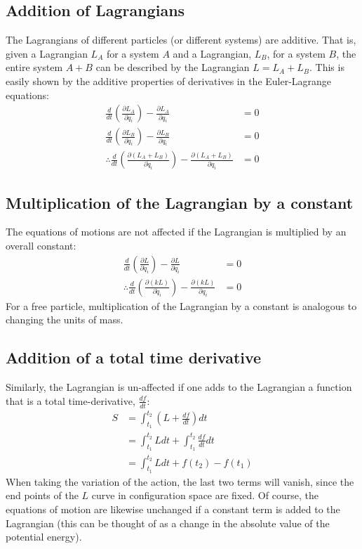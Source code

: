 \subsection{Addition of Lagrangians}
The Lagrangians of different particles (or different systems) are additive. That is, given a Lagrangian $L_A$ for a system $A$ and a Lagrangian, $L_B$, for a system $B$, the entire system $A+B$ can be described by the Lagrangian $L=L_A+L_B$. This is easily shown by the additive properties of derivatives in the Euler-Lagrange equations:
\begin{align}
\frac{d}{dt}\left(\frac{\partial L_A}{\partial \dot{q}_i} \right) - \frac{\partial L_A}{\partial q_i}&=0\nonumber\\
\frac{d}{dt}\left(\frac{\partial L_B}{\partial \dot{q}_i} \right) - \frac{\partial L_B}{\partial q_i}&=0\nonumber\\
\therefore \frac{d}{dt}\left(\frac{\partial (L_A+L_B)}{\partial \dot{q}_i} \right) - \frac{\partial (L_A+L_B)}{\partial q_i}&=0
\end{align}
\subsection{Multiplication of the Lagrangian by a constant}
The equations of motions are not affected if the Lagrangian is multiplied by an overall constant:
\begin{align}
\frac{d}{dt}\left(\frac{\partial L}{\partial \dot{q}_i} \right) - \frac{\partial L}{\partial q_i}&=0\nonumber\\
\therefore\frac{d}{dt}\left(\frac{\partial (kL)}{\partial \dot{q}_i} \right) - \frac{\partial (kL)}{\partial q_i}&=0
\end{align}
For a free particle, multiplication of the Lagrangian by a constant is analogous to changing the units of mass.
\subsection{Addition of a total time derivative }
Similarly, the Lagrangian is un-affected if one adds to the Lagrangian a function that is a total time-derivative, $\frac{df}{dt}$:
\begin{align}
S&=\int_{t_1}^{t_2} \left(L+\frac{df}{dt}\right) dt\nonumber\\
&=\int_{t_1}^{t_2} Ldt+\int_{t_1}^{t_2}\frac{df}{dt}dt\nonumber\\
&=\int_{t_1}^{t_2} Ldt +f(t_2)-f(t_1)
\end{align}
When taking the variation of the action, the last two terms will vanish, since the end points of the $L$ curve in configuration space are fixed. Of course, the equations of motion are likewise unchanged if a constant term is added to the Lagrangian (this can be thought of as a change in the absolute value of the potential energy).

